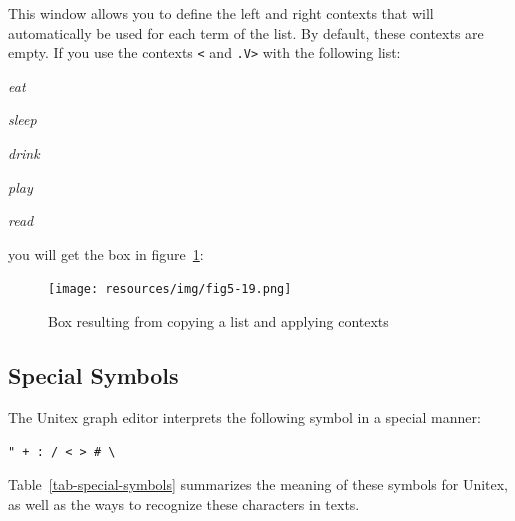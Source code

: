 \noindent This window allows you to define the left and right contexts that will
automatically be used for each term of the list. By default, these contexts are
empty. If you use the contexts  \verb+<+ and \verb+.V>+ with the following list:

\bigskip
\textit{eat}

\textit{sleep}

\textit{drink}

\textit{play}

\textit{read}

\bigskip
\noindent you will get the box in figure~\ref{fig-multiple-copy}:

\bigskip
\begin{figure}[!ht]
\begin{center}
\texttt{[image: resources/img/fig5-19.png]}
\caption{Box resulting from copying a list and applying contexts\label{fig-multiple-copy}}
\end{center}
\end{figure}

\subsection{Special Symbols}
\noindent The Unitex graph editor interprets the following symbol in a special manner:

\bigskip
\verb," + : / < > # \,

\bigskip
\noindent Table~\ref{tab-special-symbols} summarizes the meaning of
these symbols for Unitex, as well as the ways to recognize these characters in texts.


